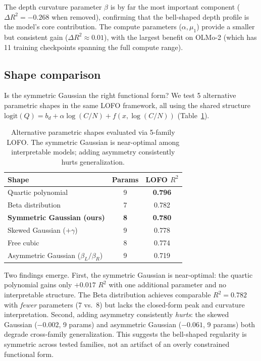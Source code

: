 \documentclass{article}
\begin{document}
The depth curvature parameter $\beta$ is by far the most important component ($\Delta R^2 = -0.268$ when removed), confirming that the bell-shaped depth profile is the model's core contribution. The compute parameters ($\alpha, \mu_1$) provide a smaller but consistent gain ($\Delta R^2 \approx 0.01$), with the largest benefit on OLMo-2 (which has 11 training checkpoints spanning the full compute range).

\subsection{Shape comparison}
\label{sec:shapes}

Is the symmetric Gaussian the right functional form? We test 5 alternative parametric shapes in the same LOFO framework, all using the shared structure $\text{logit}(Q) = b_d + \alpha \log(C/N) + f(x, \log(C/N))$ (Table~\ref{tab:shapes}).

\begin{table}[t]
\centering
\caption{Alternative parametric shapes evaluated via 5-family LOFO. The symmetric Gaussian is near-optimal among interpretable models; adding asymmetry consistently hurts generalization.}
\label{tab:shapes}
\begin{tabular}{lcc}
\toprule
Shape & Params & LOFO $R^2$ \\
\midrule
Quartic polynomial & 9 & \textbf{0.796} \\
Beta distribution & 7 & 0.782 \\
\textbf{Symmetric Gaussian (ours)} & \textbf{8} & \textbf{0.780} \\
Skewed Gaussian ($+\gamma$) & 9 & 0.778 \\
Free cubic & 8 & 0.774 \\
Asymmetric Gaussian ($\beta_L/\beta_R$) & 9 & 0.719 \\
\bottomrule
\end{tabular}
\end{table}

Two findings emerge. First, the symmetric Gaussian is near-optimal: the quartic polynomial gains only $+0.017$ $R^2$ with one additional parameter and no interpretable structure. The Beta distribution achieves comparable $R^2 = 0.782$ with \emph{fewer} parameters (7 vs.\ 8) but lacks the closed-form peak and curvature interpretation. Second, adding asymmetry consistently \emph{hurts}: the skewed Gaussian ($-0.002$, 9 params) and asymmetric Gaussian ($-0.061$, 9 params) both degrade cross-family generalization. This suggests the bell-shaped regularity is symmetric across tested families, not an artifact of an overly constrained functional form.
\end{document}
